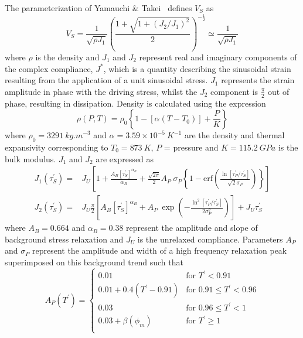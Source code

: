 \documentclass{article}
\begin{document}
The parameterization of Yamauchi \& Takei~\cite{YT16} defines $V_S$ as
\begin{equation}
V_S = \frac{1}{\sqrt{\rho J_1}} \left( \frac{1+\sqrt{1+(J_2/J_1)^2}}{2}\right)^{-\frac{1}{2}} \simeq \frac{1}{\sqrt{\rho J_1}}
\label{eq:Vs}
\end{equation}
where $\rho$ is the density and $J_1$ and $J_2$ represent real and imaginary components of the complex compliance, $J^*$, which is a quantity describing the sinusoidal strain resulting from the application of a unit sinusoidal stress. $J_1$ represents the strain amplitude in phase with the driving stress, whilst the $J_2$ component is $\frac{\pi}{2}$ out of phase, resulting in dissipation. Density is calculated using the expression
\begin{equation}
\rho (P,T) = \rho_{0}  \left\{ 1 - \left[\alpha(T - T_0)\right] + \frac{P}{K} \right\}
\label{eq:density_P}
\end{equation}
where $\rho_{0} = 3291~\si{kg . m}^{-3}$ and $\alpha = 3.59 \times 10^{-5}~\si{K}^{-1}$ are the density and thermal expansivity corresponding to $T_{0} = 873~\si{K}$, $P$ = pressure and $K = 115.2~\si{GPa}$ is the bulk modulus. $J_1$ and $J_2$ are expressed as
\begin{align}
J_1(\tau_S^{\prime})= & J_U \left[ 1 + \frac{A_B[\tau_S^{\prime}]^{\alpha_B}}{\alpha_B} + \frac{\sqrt{2\pi}}{2} A_P~\sigma_P \left\{ 1-\text{erf}\left(\frac{\ln[\tau_P^{\prime}/\tau_S^{\prime}]}{\sqrt{2}\sigma_P}\right)\right\}\right] \label{eqn:real_compliance} \\
J_2(\tau_S^{\prime}) = & J_U \frac{\pi}{2} \left[ A_B[\tau_S^{\prime}]^{\alpha_B} + A_P~\exp \left(-\frac{\ln^2[\tau_P^{\prime}/\tau_S^{\prime}]}{2\sigma_P^2}\right)\right] + J_U \tau_S^{\prime}
\label{eqn:imaginary_compliance}
\end{align}
where $A_B = 0.664$ and $\alpha_B = 0.38$ represent the amplitude and slope of background stress relaxation and $J_U$ is the unrelaxed compliance. Parameters $A_P$ and $\sigma_P$ represent the amplitude and width of a high frequency relaxation peak superimposed on this background trend such that
\begin{equation}
A_P(T^{\prime}) = \begin{cases}
0.01  &  \text{for }T^{\prime} < 0.91 \\
0.01+0.4(T^{\prime}-0.91) & \text{for }0.91\leq T^{\prime} < 0.96 \\
0.03 & \text{for }0.96\leq T^{\prime} < 1 \\
0.03+\beta(\phi_m) & \text{for }T^{\prime} \geq 1 \\
\end{cases}
\end{equation}
\end{document}
